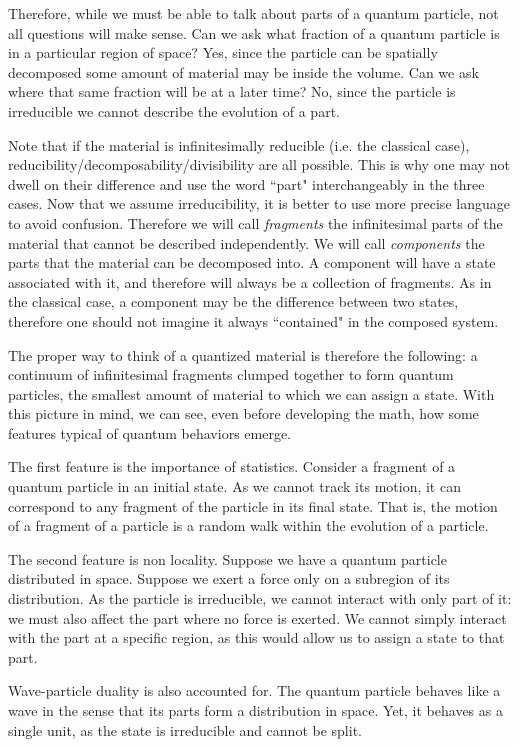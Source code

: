 \documentclass[aps,pra,10pt,twocolumn,floatfix,nofootinbib]{revtex4-1}
\numberwithin{equation}{section}
\theoremstyle{definition}
\begin{document}
Therefore, while we must be able to talk about parts of a quantum particle, not all questions will make sense. Can we ask what fraction of a quantum particle is in a particular region of space? Yes, since the particle can be spatially decomposed some amount of material may be inside the volume. Can we ask where that same fraction will be at a later time? No, since the particle is irreducible we cannot describe the evolution of a part.

Note that if the material is infinitesimally reducible (i.e. the classical case), reducibility/decomposability/divisibility are all possible. This is why one may not dwell on their difference and use the word ``part" interchangeably in the three cases. Now that we assume irreducibility, it is better to use more precise language to avoid confusion. Therefore we will call \emph{fragments} the infinitesimal parts of the material that cannot be described independently. We will call \emph{components} the parts that the material can be decomposed into. A component will have a state associated with it, and therefore will always be a collection of fragments. As in the classical case, a component may be the difference between two states, therefore one should not imagine it always ``contained" in the composed system.

The proper way to think of a quantized material is therefore the following: a continuum of infinitesimal fragments clumped together to form quantum particles, the smallest amount of material to which we can assign a state. With this picture in mind, we can see, even before developing the math, how some features typical of quantum behaviors emerge.

The first feature is the importance of statistics. Consider a fragment of a quantum particle in an initial state. As we cannot track its motion, it can correspond to any fragment of the particle in its final state. That is, the motion of a fragment of a particle is a random walk within the evolution of a particle.

The second feature is non locality. Suppose we have a quantum particle distributed in space. Suppose we exert a force only on a subregion of its distribution. As the particle is irreducible, we cannot interact with only part of it: we must also affect the part where no force is exerted. We cannot simply interact with the part at a specific region, as this would allow us to assign a state to that part.

Wave-particle duality is also accounted for. The quantum particle behaves like a wave in the sense that its parts form a distribution in space. Yet, it behaves as a single unit, as the state is irreducible and cannot be split.
\end{document}
